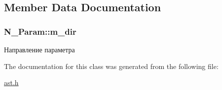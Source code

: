\subsection{Member Data Documentation}
\hypertarget{classN__Param_a72e88bb3b11584177bae2b66e009f9fb}{}
\subsubsection[{m\+\_\+dir}]{ N\+\_\+\+Param\+::m\+\_\+dir\hspace{0.3cm}{\ttfamily [protected]}}\label{classN__Param_a72e88bb3b11584177bae2b66e009f9fb}


Направление параметра 



The documentation for this class was generated from the following file\+:\begin{DoxyCompactItemize}
\item 
\hyperlink{ast_8h}{ast.\+h}\end{DoxyCompactItemize}
